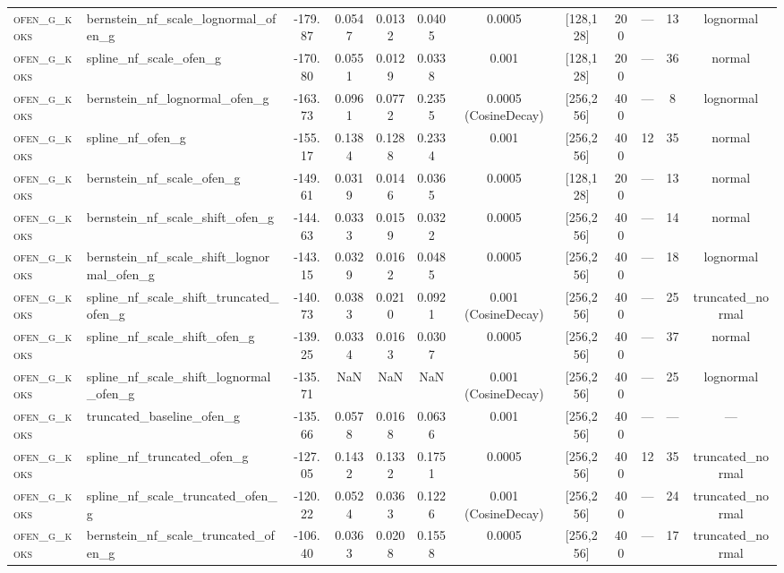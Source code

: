 \begin{table}[htbp]
\begin{tabular}{llS[table-format=-4.2]S[table-format=-4.2]S[table-format=-1.4]S[table-format=-1.4]cccccc}
\textsc{ofen\_g\_koks} & bernstein_nf_scale_lognormal_ofen_g & -179.87 & 0.0547 & 0.0132 & 0.0405 & 0.0005 & [128,128] & 200 & — & 13 & lognormal \\
\textsc{ofen\_g\_koks} & spline_nf_scale_ofen_g & -170.80 & 0.0551 & 0.0129 & 0.0338 & 0.001 & [128,128] & 200 & — & 36 & normal \\
\textsc{ofen\_g\_koks} & bernstein_nf_lognormal_ofen_g & -163.73 & 0.0961 & 0.0772 & 0.2355 & 0.0005 (CosineDecay) & [256,256] & 400 & — & 8 & lognormal \\
\textsc{ofen\_g\_koks} & spline_nf_ofen_g & -155.17 & 0.1384 & 0.1288 & 0.2334 & 0.001 & [256,256] & 400 & 12 & 35 & normal \\
\textsc{ofen\_g\_koks} & bernstein_nf_scale_ofen_g & -149.61 & 0.0319 & 0.0146 & 0.0365 & 0.0005 & [128,128] & 200 & — & 13 & normal \\
\textsc{ofen\_g\_koks} & bernstein_nf_scale_shift_ofen_g & -144.63 & 0.0333 & 0.0159 & 0.0322 & 0.0005 & [256,256] & 400 & — & 14 & normal \\
\textsc{ofen\_g\_koks} & bernstein_nf_scale_shift_lognormal_ofen_g & -143.15 & 0.0329 & 0.0162 & 0.0485 & 0.0005 & [256,256] & 400 & — & 18 & lognormal \\
\textsc{ofen\_g\_koks} & spline_nf_scale_shift_truncated_ofen_g & -140.73 & 0.0383 & 0.0210 & 0.0921 & 0.001 (CosineDecay) & [256,256] & 400 & — & 25 & truncated_normal \\
\textsc{ofen\_g\_koks} & spline_nf_scale_shift_ofen_g & -139.25 & 0.0334 & 0.0163 & 0.0307 & 0.0005 & [256,256] & 400 & — & 37 & normal \\
\textsc{ofen\_g\_koks} & spline_nf_scale_shift_lognormal_ofen_g & -135.71 & NaN & NaN & NaN & 0.001 (CosineDecay) & [256,256] & 400 & — & 25 & lognormal \\
\textsc{ofen\_g\_koks} & truncated_baseline_ofen_g & -135.66 & 0.0578 & 0.0168 & 0.0636 & 0.001 & [256,256] & 400 & — & — & — \\
\textsc{ofen\_g\_koks} & spline_nf_truncated_ofen_g & -127.05 & 0.1432 & 0.1332 & 0.1751 & 0.0005 & [256,256] & 400 & 12 & 35 & truncated_normal \\
\textsc{ofen\_g\_koks} & spline_nf_scale_truncated_ofen_g & -120.22 & 0.0524 & 0.0363 & 0.1226 & 0.001 (CosineDecay) & [256,256] & 400 & — & 24 & truncated_normal \\
\textsc{ofen\_g\_koks} & bernstein_nf_scale_truncated_ofen_g & -106.40 & 0.0363 & 0.0208 & 0.1558 & 0.0005 & [256,256] & 400 & — & 17 & truncated_normal \\

\end{tabular}
\end{table}
